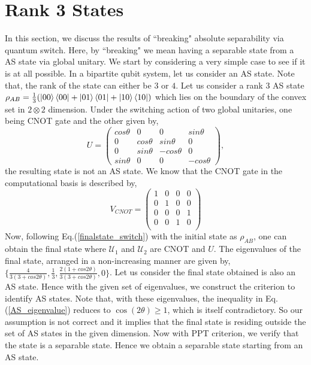 \section{Rank 3 States}
In this section, we discuss the results of ``breaking" absolute separability via quantum switch. Here, by ``breaking" we mean having a separable state from a AS state via global unitary. We start by considering a very simple case to see if it is at all possible. In a bipartite qubit system, let us consider an AS state. Note that, the rank of the state can either be $3$ or $4$. 
    Let us consider a rank $3$ AS state $\rho_{AB}=\frac{1}{3} (\ket{00}\bra{00}+\ket{01}\bra{01}+\ket{10}\bra{10})$ which lies on the boundary of the convex set in $2\otimes 2$ dimension. Under the switching action of two global unitaries, one being CNOT gate and the other given by, 
    \begin{equation}
        U = 
    \begin{pmatrix}
        cos\theta & 0 & 0 & sin\theta\\
        0 & cos\theta & sin\theta & 0\\
        0 & sin\theta & -cos\theta & 0\\
        sin\theta & 0 & 0 & -cos\theta
    \end{pmatrix},
    \label{unitary_theta}
    \end{equation}
    the resulting state is not an AS state.    We know that the CNOT gate in the computational basis is described by,
    \begin{equation}
    V_{CNOT}= \left(
    \begin{array}{cccc}
     1 & 0 & 0 & 0 \\
     0 & 1 & 0 & 0 \\
     0 & 0 & 0 & 1 \\
     0 & 0 & 1 & 0 \\
    \end{array}
    \right)
    \end{equation}
    Now, following Eq.(\ref{finalstate_switch}) with the initial state as $\rho_{AB}$, one can obtain the final state where $\mathcal{U}_1$ and $\mathcal{U}_2$ are CNOT and $U$. The eigenvalues of the final state, arranged in a non-increasing manner are given by, $\{ \frac{4}{3(3+cos2\theta)}, \frac{1}{3}, \frac{2(1+cos2\theta)}{3(3+cos2\theta)},0 \}$. Let us consider the final state obtained is also an AS state. Hence with the given set of eigenvalues, we construct the criterion to identify AS states. Note that, with these eigenvalues, the inequality in Eq. (\ref{AS_eigenvalue}) reduces to $\cos{(2\theta)}\geq 1$, which is itself contradictory. So our assumption is not correct and it implies that the final state is residing outside the set of AS states in the given dimension. Now with PPT criterion, we verify that the state is a separable state. Hence we obtain a separable state starting from an AS state.
